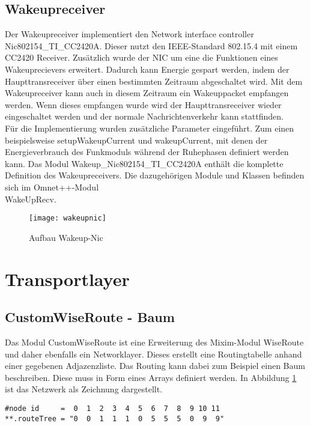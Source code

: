 \subsection{Wakeupreceiver}

Der Wakeupreceiver implementiert den Network interface controller\\ Nic802154\_TI\_CC2420A. Dieser nutzt den IEEE-Standard 802.15.4 mit einem CC2420 Receiver. Zusätzlich wurde der NIC um eine die Funktionen eines Wakeuprecievers erweitert. Dadurch kann Energie gespart werden, indem der Haupttransreceiver über einen bestimmten Zeitraum abgeschaltet wird. Mit dem Wakeupreceiver kann auch in diesem Zeitraum ein Wakeuppacket empfangen werden. Wenn dieses empfangen wurde wird der Haupttransreceiver wieder eingeschaltet werden und der normale Nachrichtenverkehr kann stattfinden.\\
Für die Implementierung wurden zusätzliche Parameter eingeführt. Zum einen beispielsweise setupWakeupCurrent und wakeupCurrent, mit denen der Energieverbrauch des Funkmoduls während der Ruhephasen definiert werden kann. Das Modul Wakeup\_Nic802154\_TI\_CC2420A enthält die komplette Definition des Wakeupreceivers. Die dazugehörigen Module und Klassen befinden sich im Omnet++-Modul \\ WakeUpRecv.

\begin{figure}[htbp]
\centering
\caption{Aufbau Wakeup-Nic}
\label{fig:routingbsp}
\texttt{[image: wakeupnic]}
\end{figure}

\section{Transportlayer}
\subsection{CustomWiseRoute - Baum}
Das Modul CustomWiseRoute ist eine Erweiterung des Mixim-Modul WiseRoute und daher ebenfalls ein Networklayer. Dieses erstellt eine Routingtabelle anhand einer gegebenen Adjazenzliste. Das Routing kann dabei zum Beispiel einen Baum beschreiben. Diese muss in Form eines Arrays definiert werden. In Abbildung \ref{fig:routingbsp} ist das Netzwerk als Zeichnung dargestellt.

\begin{minipage}{\textwidth}
\begin{lstlisting}
#node id     =  0  1  2  3  4  5  6  7  8  9 10 11
**.routeTree = "0  0  1  1  1  0  5  5  5  0  9  9"
\end{lstlisting}
\end{minipage}

